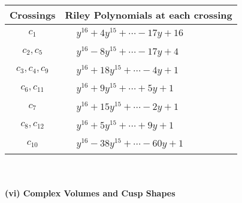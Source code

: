 \documentclass[1p]{elsarticle_modified}
\theoremstyle{definition}
\begin{document}
\begin{tabular}{m{50pt}|m{274pt}}
Crossings & \hspace{64pt}Riley Polynomials at each crossing \\
\hline $$\begin{aligned}c_{1}\end{aligned}$$&$\begin{aligned}
&y^{16}+4 y^{15}+\cdots-17 y+16
\end{aligned}$\\
\hline $$\begin{aligned}c_{2},c_{5}\end{aligned}$$&$\begin{aligned}
&y^{16}-8 y^{15}+\cdots-17 y+4
\end{aligned}$\\
\hline $$\begin{aligned}c_{3},c_{4},c_{9}\end{aligned}$$&$\begin{aligned}
&y^{16}+18 y^{15}+\cdots-4 y+1
\end{aligned}$\\
\hline $$\begin{aligned}c_{6},c_{11}\end{aligned}$$&$\begin{aligned}
&y^{16}+9 y^{15}+\cdots+5 y+1
\end{aligned}$\\
\hline $$\begin{aligned}c_{7}\end{aligned}$$&$\begin{aligned}
&y^{16}+15 y^{15}+\cdots-2 y+1
\end{aligned}$\\
\hline $$\begin{aligned}c_{8},c_{12}\end{aligned}$$&$\begin{aligned}
&y^{16}+5 y^{15}+\cdots+9 y+1
\end{aligned}$\\
\hline $$\begin{aligned}c_{10}\end{aligned}$$&$\begin{aligned}
&y^{16}-38 y^{15}+\cdots-60 y+1
\end{aligned}$\\
\hline
\end{tabular}\\~\\
\newpage\flushleft \textbf{(vi) Complex Volumes and Cusp Shapes}
\end{document}
